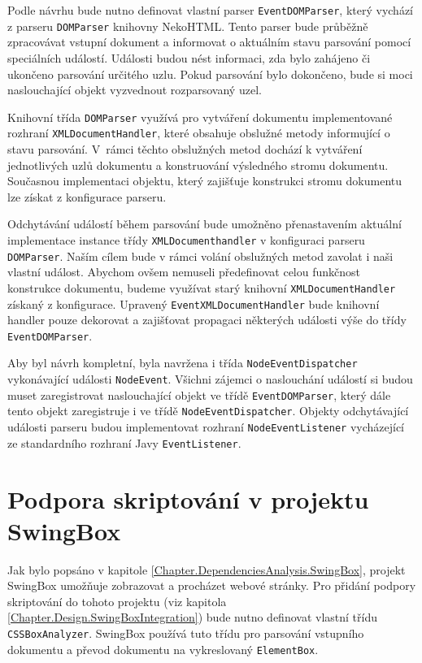 Podle návrhu bude nutno definovat vlastní parser \texttt{EventDOMParser}, který vychází z parseru \texttt{DOMParser} knihovny NekoHTML. Tento parser bude průběžně zpracovávat vstupní dokument a informovat o aktuálním stavu parsování pomocí speciálních událostí. Události budou nést informaci, zda bylo zahájeno či ukončeno parsování určitého uzlu. Pokud parsování bylo dokončeno, bude si moci naslouchající objekt vyzvednout rozparsovaný uzel. 

Knihovní třída \texttt{DOMParser} využívá pro vytváření dokumentu implementované rozhraní \texttt{XMLDocumentHandler}, které obsahuje obslužné metody informující o stavu parsování. V~rámci těchto obslužných metod dochází k vytváření jednotlivých uzlů dokumentu a konstruování výsledného stromu dokumentu. Současnou implementaci objektu, který zajišťuje konstrukci stromu dokumentu lze získat z konfigurace parseru.

Odchytávání událostí během parsování bude umožněno přenastavením aktuální implementace instance třídy \texttt{XMLDocumenthandler} v konfiguraci parseru \texttt{DOMParser}. Naším cílem bude v rámci volání obslužných metod zavolat i naši vlastní událost. Abychom ovšem nemuseli předefinovat celou funkčnost konstrukce dokumentu, budeme využívat starý knihovní \texttt{XMLDocumentHandler} získaný z konfigurace. Upravený \texttt{EventXMLDocumentHandler} bude knihovní handler pouze dekorovat a zajišťovat propagaci některých události výše do třídy \texttt{EventDOMParser}. 

Aby byl návrh kompletní, byla navržena i třída \texttt{NodeEventDispatcher} vykonávající události \texttt{NodeEvent}. Všichni zájemci o naslouchání událostí si budou muset zaregistrovat naslouchající objekt ve třídě \texttt{EventDOMParser}, který dále tento objekt zaregistruje i ve třídě \texttt{NodeEventDispatcher}. Objekty odchytávající události parseru budou implementovat rozhraní \texttt{NodeEventListener} vycházející ze standardního rozhraní Javy \texttt{EventListener}.

\section{Podpora skriptování v projektu SwingBox}
\label{Chapter.Design.ScriptsInSwingBox}

Jak bylo popsáno v kapitole \ref{Chapter.DependenciesAnalysis.SwingBox}, projekt SwingBox umožňuje zobrazovat a procházet webové stránky. Pro přidání podpory skriptování do tohoto projektu (viz kapitola \ref{Chapter.Design.SwingBoxIntegration}) bude nutno definovat vlastní třídu \texttt{CSSBoxAnalyzer}. SwingBox používá tuto třídu pro parsování vstupního dokumentu a převod dokumentu na vykreslovaný \texttt{ElementBox}.   

